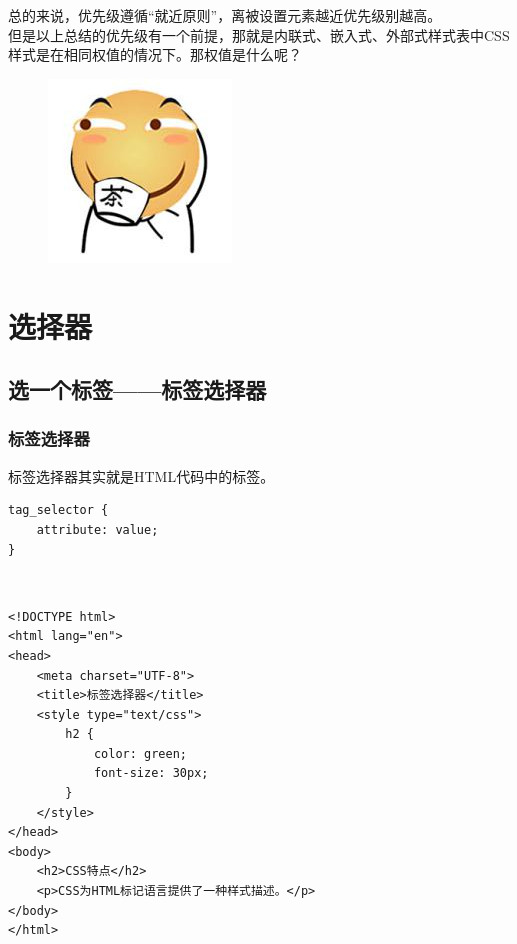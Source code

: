 总的来说，优先级遵循“就近原则”，离被设置元素越近优先级别越高。 \\

但是以上总结的优先级有一个前提，那就是内联式、嵌入式、外部式样式表中CSS样式是在相同权值的情况下。那权值是什么呢？

\begin{figure}[H]
	\centering
	\includegraphics[]{img/C5/5-5/1.png}
\end{figure}

\newpage

\chapter{选择器}

\section{选一个标签——标签选择器}

\subsection{标签选择器}

标签选择器其实就是HTML代码中的标签。 \\

\begin{lstlisting}[style=htmlcssjs]
tag_selector {
    attribute: value;
}
\end{lstlisting}

\vspace{0.5cm}

 \\

\begin{lstlisting}[style=htmlcssjs]
<!DOCTYPE html>
<html lang="en">
<head>
    <meta charset="UTF-8">
    <title>标签选择器</title>
    <style type="text/css">
        h2 {
            color: green;
            font-size: 30px;
        }
    </style>
</head>
<body>
    <h2>CSS特点</h2>
    <p>CSS为HTML标记语言提供了一种样式描述。</p>
</body>
</html>
\end{lstlisting}

